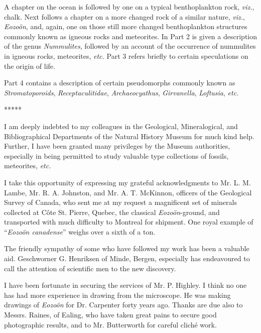 \documentclass[a4paper, 12pt, oneside]{article}
\begin{document}
A chapter on the ocean is followed by one on a typical benthoplankton rock, \emph{viz.}, chalk. Next follows a chapter on a more changed rock of a similar nature, \emph{viz.}, \emph{Eozoön}, and, again, one on those still more changed benthoplankton structures commonly known as igneous rocks and meteorites. In Part 2 is given a description of the genus \emph{Nummulites}, followed by an account of the occurrence of nummulites in igneous rocks, meteorites, \emph{etc.} Part 3 refers briefly to certain speculations on the origin of life.

Part 4 contains a description of certain pseudomorphs commonly known as \emph{Stromatoporoids}, \emph{Receptaculitidae}, \emph{Archaeocyathus}, \emph{Girvanella}, \emph{Loftusia}, \emph{etc.}

\centerline{*\hspace{15mm}*\hspace{15mm}*\hspace{15mm}*\hspace{15mm}*}
\bigskip

I am deeply indebted to my colleagues in the Geological, Mineralogical, and Bibliographical Departments of the Natural History Museum for much kind help. Further, I have been granted many privileges by the Museum authorities, especially in being permitted to study valuable type collections of fossils, meteorites, \emph{etc.}

I take this opportunity of expressing my grateful acknowledgments to Mr. L. M. Lambe, Mr. R. A. Johnston, and Mr. A. T. McKinnon, officers of the Geological Survey of Canada, who sent me at my request a magnificent set of minerals collected at Côte St. Pierre, Quebec, the classical \emph{Eozoön}-ground, and transported with much difficulty to Montreal for shipment. One royal example of ``\emph{Eozoön canadense}'' weighs over a sixth of a ton.

The friendly sympathy of some who have followed my work has been a valuable aid. Geschworner G. Henriksen of Minde, Bergen, especially has endeavoured to call the attention of scientific men to the new discovery.

I have been fortunate in securing the services of Mr. P. Highley. I think no one has had more experience in drawing from the microscope. He was making drawings of \emph{Eozoön} for Dr. Carpenter forty years ago. Thanks are due also to Messrs. Raines, of Ealing, who have taken great pains to secure good photographic results, and to Mr. Butterworth for careful cliché work.
\end{document}
